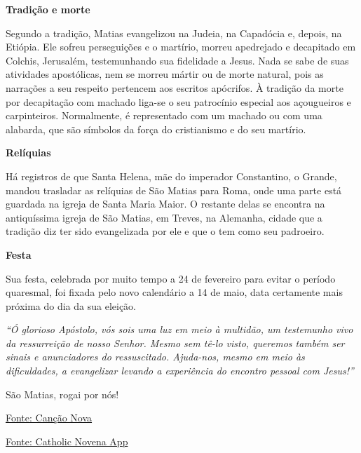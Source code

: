 \documentclass[18pt]{article}
\begin{document}
\begin{justify}
\begin{justify}
\textbf{Tradição e morte}

Segundo a tradição, Matias evangelizou na Judeia, na Capadócia e, depois, na Etiópia. Ele sofreu perseguições e o martírio, morreu apedrejado e decapitado em Colchis, Jerusalém, testemunhando sua fidelidade a Jesus. Nada se sabe de suas atividades apostólicas, nem se morreu mártir ou de morte natural, pois as narrações a seu respeito pertencem aos escritos apócrifos. À tradição da morte por decapitação com machado liga-se o seu patrocínio especial aos açougueiros e carpinteiros. Normalmente, é representado com um machado ou com uma alabarda, que são símbolos da força do cristianismo e do seu martírio.

\textbf{Relíquias}

Há registros de que Santa Helena, mãe do imperador Constantino, o Grande, mandou trasladar as relíquias de São Matias para Roma, onde uma parte está guardada na igreja de Santa Maria Maior. O restante delas se encontra na antiquíssima igreja de São Matias, em Treves, na Alemanha, cidade que a tradição diz ter sido evangelizada por ele e que o tem como seu padroeiro.

\textbf{Festa}

Sua festa, celebrada por muito tempo a 24 de fevereiro para evitar o período quaresmal, foi fixada pelo novo calendário a 14 de maio, data certamente mais próxima do dia da sua eleição.

\vspace{1em}

\textit{“Ó glorioso Apóstolo, vós sois uma luz em meio à multidão, um testemunho vivo da ressurreição de nosso Senhor. Mesmo sem tê-lo visto, queremos também ser sinais e anunciadores do ressuscitado. Ajuda-nos, mesmo em meio às dificuldades, a evangelizar levando a experiência do encontro pessoal com Jesus!”}

\vspace{1em}

\begin{flushright}
São Matias, rogai por nós!
\end{flushright}

\vfill

\begin{center}
\href{https://santo.cancaonova.com/santo/sao-matias-apostolo-e-martir-testemunho-vivo-da-ressurreicao-de-jesus/}{Fonte: Canção Nova}
\end{center}
\end{justify}

\vfill

\begin{center}
\href{https://catholicnovenaapp.com/saints/about-st-matthias-apostle/}{Fonte: Catholic Novena App}
\end{center}
\end{justify}
\end{document}
